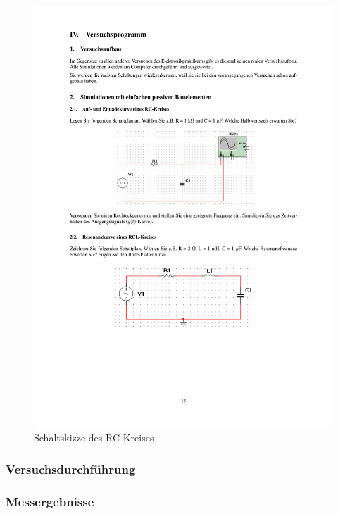 \documentclass[12pt,a4paper]{article}
\begin{document}
\begin{figure}[H] 
  \centering
    \includegraphics[trim = 10mm 155mm 10mm 85mm, clip, scale = 1]{ep5_14[Page13].pdf}
  	\caption[Schaltskizze des RC-Kreises]{Schaltskizze des RC-Kreises\footnotemark}
  \label{fig:1}
\end{figure}

\subsubsection{Versuchsdurchführung}

\subsubsection{Messergebnisse}
\end{document}
